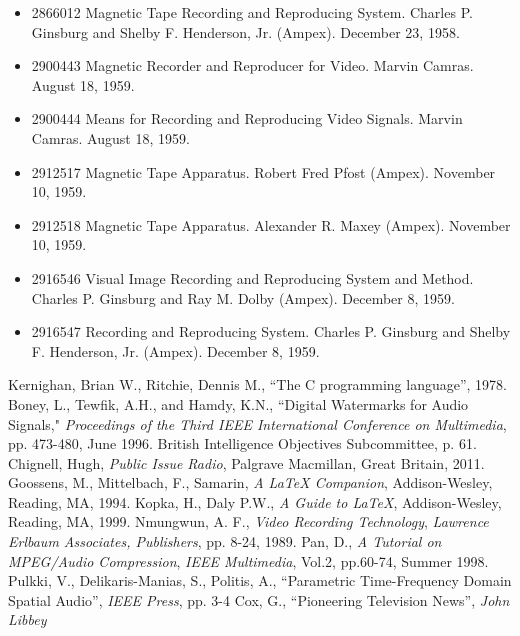 \documentclass[UKenglish]{ifimaster}  %
\begin{document}
\begin{itemize}
\item 2866012 Magnetic Tape Recording and Reproducing System. Charles P. Ginsburg and Shelby F. Henderson, Jr. (Ampex).  December 23, 1958.
\item 2900443 Magnetic Recorder and Reproducer for Video. Marvin Camras.  August 18, 1959.
\item 2900444 Means for Recording and Reproducing Video Signals. Marvin Camras.  August 18, 1959.
\item 2912517 Magnetic Tape Apparatus. Robert Fred Pfost (Ampex).  November 10, 1959.
\item 2912518 Magnetic Tape Apparatus. Alexander R. Maxey (Ampex).  November 10, 1959.
\item 2916546 Visual Image Recording and Reproducing System and Method. Charles P. Ginsburg and Ray M. Dolby (Ampex). December 8, 1959.
\item 2916547 Recording and Reproducing System. Charles P. Ginsburg and Shelby F. Henderson, Jr. (Ampex).  December 8, 1959.
\end{itemize}

\begin{thebibliography}{100}
 Kernighan, Brian W., Ritchie, Dennis M., ``The C programming language'', 1978.
 Boney, L., Tewfik, A.H., and Hamdy, K.N., ``Digital Watermarks for Audio Signals," \emph{Proceedings of the Third IEEE International Conference on Multimedia}, pp. 473-480, June 1996.
 British Intelligence Objectives Subcommittee, p. 61.
 Chignell, Hugh, \emph{Public Issue Radio}, Palgrave Macmillan, Great Britain, 2011.
  Goossens, M., Mittelbach, F., Samarin, \emph{A LaTeX Companion}, Addison-Wesley, Reading, MA, 1994.
  Kopka, H., Daly P.W., \emph{A Guide to LaTeX}, Addison-Wesley, Reading, MA, 1999.
 Nmungwun, A. F., \emph{Video Recording Technology}, \emph{Lawrence Erlbaum Associates, Publishers}, pp. 8-24, 1989.
 Pan, D., \emph{A Tutorial on MPEG/Audio Compression}, \emph{IEEE Multimedia}, Vol.2, pp.60-74, Summer 1998.
 Pulkki, V., Delikaris-Manias, S., Politis, A., ``Parametric Time-Frequency Domain Spatial Audio'', \emph{IEEE Press}, pp. 3-4
 Cox, G., ``Pioneering Television News'', \emph{John Libbey}
\end{thebibliography}

\backmatter{}\\

\printbibliography
\end{document}
